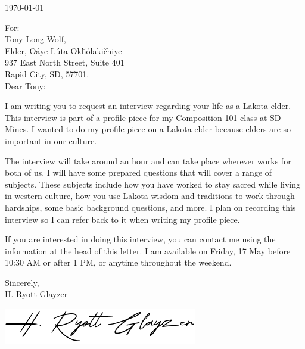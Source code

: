 \documentclass[
10pt, %
letterpaper, %
oneside, %
footinclude, %
BCOR5mm, %
]{scrartcl}
\title{\normalfont\fontsize{20}{10}\selectfont \spacedlowsmallcaps{H. Ryott Glayzer}} %
\subtitle{%
    Lab Assistant, Physics Dept. -- SD Mines\\
    306 East Saint Joseph Street\\
    Rapid City, South Dakota 57701\\
    \href{mailto:h.ryott.glayzer@ryott.gay}{h.ryott.glayzer@ryott.gay} \\
    +1 (605) 858-3899
} %
\date{} %
\newcommand{\ToAddr}[1]{\noindent For:\\ #1}
\newcommand{\LetterDate}[1]{\noindent#1\par\vspace{2em}}
\newcommand{\Sign}[1]{\vspace{2em}\noindent Sincerely,\\ #1\par\vspace{0.5em}}
\begin{document}
\maketitle %

\vspace{-4em}

\LetterDate{\today}
\vspace{-0.8em}
\ToAddr{%
    Tony Long Wolf,\\
    Elder, Oáye Lúta Okȟólakičhiye\\
    937 East North Street, Suite 401\\
    Rapid City, SD, 57701.\\}



\noindent Dear Tony:
\vspace{5mm}

I am writing you to request an interview regarding your life as a Lakota elder.
This interview is part of a profile piece for my Composition 101 class at SD Mines.
I wanted to do my profile piece on a Lakota elder because elders are so important
in our culture.
\vspace{5mm}

The interview will take around an hour and can take place wherever works for both of us.
I will have some prepared questions that will cover a range of subjects.
These subjects include how you have worked to stay sacred while living in western culture,
how you use Lakota wisdom and traditions to work through hardships, 
some basic background questions, and more.
I plan on recording this interview so I can refer back to it when writing my profile piece.
\vspace{5mm}

If you are interested in doing this interview, you can contact me using the
information at the head of this letter.
I am available on Friday, 17 May before 10:30 AM or after 1 PM, or anytime throughout the weekend.







\Sign{H. Ryott Glayzer}
\noindent\includegraphics[scale=2.5]{signature.png}
\end{document}
